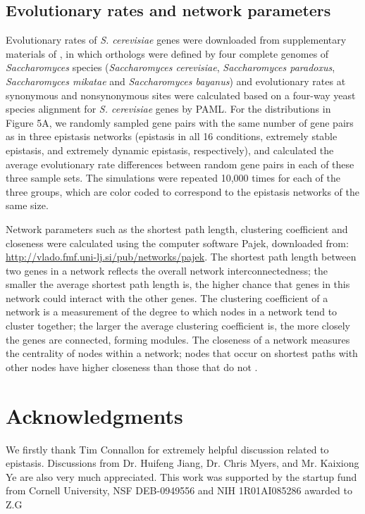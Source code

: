 \subsection{Evolutionary rates and network parameters}

Evolutionary rates of \textit{S. cerevisiae} genes were downloaded
from supplementary materials of \citealt{Wall2005}, in which orthologs were
defined by four complete genomes of \textit{Saccharomyces} species
(\textit{Saccharomyces cerevisiae}, \textit{Saccharomyces paradoxus},
\textit{Saccharomyces mikatae} and \textit{Saccharomyces bayanus}) and
evolutionary rates at synonymous and nonsynonymous sites were
calculated based on a four-way yeast species alignment for
\textit{S. cerevisiae} genes by PAML. For the distributions in Figure
5A, we randomly sampled gene pairs with the same number of gene pairs
as in three epistasis networks (epistasis in all 16 conditions,
extremely stable epistasis, and extremely dynamic epistasis,
respectively), and calculated the average evolutionary rate
differences between random gene pairs in each of these three sample
sets. The simulations were repeated 10,000 times for each of the three
groups, which are color coded to correspond to the epistasis networks
of the same size.

Network parameters such as the shortest path length, clustering
coefficient and closeness were calculated using the computer software
Pajek, downloaded from:
\url{http://vlado.fmf.uni-lj.si/pub/networks/pajek}. The shortest path
length between two genes in a network reflects the overall network
interconnectedness; the smaller the average shortest path length is,
the higher chance that genes in this network could interact with the
other genes. The clustering coefficient of a network is a measurement
of the degree to which nodes in a network tend to cluster together;
the larger the average clustering coefficient is, the more closely the
genes are connected, forming modules. The closeness of a network
measures the centrality of nodes within a network; nodes that occur on
shortest paths with other nodes have higher closeness than those that
do not \citep{Barabasi2004}.

\section{Acknowledgments}

We firstly thank Tim Connallon for extremely helpful discussion
related to epistasis. Discussions from Dr. Huifeng Jiang, Dr. Chris
Myers, and Mr. Kaixiong Ye are also very much appreciated. This work
was supported by the startup fund from Cornell University, NSF
DEB-0949556 and NIH 1R01AI085286 awarded to Z.G

